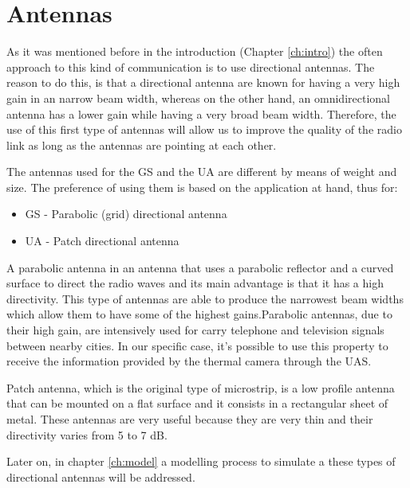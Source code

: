 \section{Antennas}\label{sec:antennas}

As it was mentioned before in the introduction (Chapter \ref{ch:intro}) the often approach to this kind of communication is to use directional antennas.
The reason to do this, is that a directional antenna are known for having a very high gain in an narrow beam width, whereas on the other hand, an omnidirectional antenna has a lower gain while having a very broad beam width.
Therefore, the use of this first type of antennas will allow us to improve the quality of the radio link as long as the antennas are pointing at each other.

The antennas used for the GS and the UA are different by means of weight and size. The preference of using them is based on the application at hand, thus for:
\begin{itemize}
	\item GS - Parabolic (grid) directional antenna 
	\item UA - Patch directional antenna
\end{itemize}

A parabolic antenna in an antenna that uses a parabolic reflector and a curved surface to direct the radio waves and its main advantage is that it has a high directivity. This type of antennas are able to produce the narrowest beam widths which allow them to have some of the highest gains.Parabolic antennas, due to their high gain, are intensively used for carry telephone and television signals between nearby cities. In our specific case, it’s possible to use this property to receive the information provided by the thermal camera through the UAS.

Patch antenna, which is the original type of microstrip, is a low profile antenna that can be mounted on a flat surface and it consists in a rectangular sheet of metal. These antennas are very useful because they are very thin and their directivity varies from 5 to 7 dB.

Later on, in chapter \ref{ch:model} a modelling process to simulate a these types of directional antennas will be addressed.